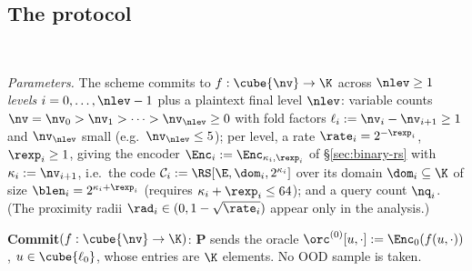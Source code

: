 \subsection{The protocol}\label{sec:protocol}

\begin{protocol}\label{fig:protocol}
\ \par\smallskip
\emph{Parameters.} The scheme commits to $f : \cube{\nv} \to \K$ across $\nlev \ge 1$ \emph{levels} $i = 0, \dots, \nlev-1$ plus a plaintext final level $\nlev$: variable counts $\nv = \nv_0 > \nv_1 > \dots > \nv_\nlev \ge 0$ with fold factors $\ell_i := \nv_i - \nv_{i+1} \ge 1$ and $\nv_\nlev$ small (e.g.\ $\nv_\nlev \le 5$); per level, a rate $\rate_i = 2^{-\rexp_i}$, $\rexp_i \ge 1$, giving the encoder $\Enc_i := \Enc_{\kappa_i, \rexp_i}$ of \S\ref{sec:binary-rs} with $\kappa_i := \nv_{i+1}$, i.e.\ the code $\mathcal{C}_i := \RS[\E, \dom_i, 2^{\kappa_i}]$ over its domain $\dom_i \subseteq \K$ of size $\blen_i = 2^{\kappa_i + \rexp_i}$ (requires $\kappa_i + \rexp_i \le 64$); and a query count $\nq_i$. (The proximity radii $\rad_i \in (0, 1 - \sqrt{\rate_i})$ appear only in the analysis.)

\smallskip
\textbf{Commit}$(f : \cube{\nv} \to \K)$: $\mathbf{P}$ sends the oracle $\orc^{(0)}[u, \cdot] := \Enc_0(f(u, \cdot))$, $u \in \cube{\ell_0}$, whose entries are $\K$ elements. No OOD sample is taken.


\end{protocol}
